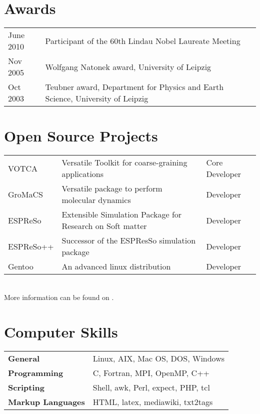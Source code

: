 \documentclass{article}
\begin{document}
\vspace{-3mm}
\section*{Awards}

\begin{tabular}{ll}
June 2010 & Participant of the 60th Lindau Nobel Laureate Meeting\\
Nov 2005  & Wolfgang Natonek award, University of Leipzig\\
Oct 2003  & Teubner award, Department for Physics and Earth Science, University of Leipzig\\
\end{tabular}

\vspace{-1mm}
\section*{Open Source Projects}

\begin{tabular}{lll}
VOTCA & Versatile Toolkit for coarse-graining applications & Core Developer \\
GroMaCS & Versatile package to perform molecular dynamics & Developer \\
ESPReSo & Extensible Simulation Package for Research on Soft matter & Developer \\
ESPReSo++ & Successor of the ESPResSo simulation package & Developer \\
Gentoo & An advanced linux distribution & Developer \\
\end{tabular}\\

More information can be found on .

\section*{Computer Skills}

\begin{tabular}{ll}
\textbf{General} & Linux, AIX, Mac OS, DOS, Windows \\
\textbf{Programming} & C, Fortran, MPI, OpenMP, C++ \\
\textbf{Scripting} & Shell, awk, Perl, expect, PHP, tcl \\
\textbf{Markup Languages} & HTML, latex, mediawiki, txt2tags \\
\end{tabular}
\end{document}
